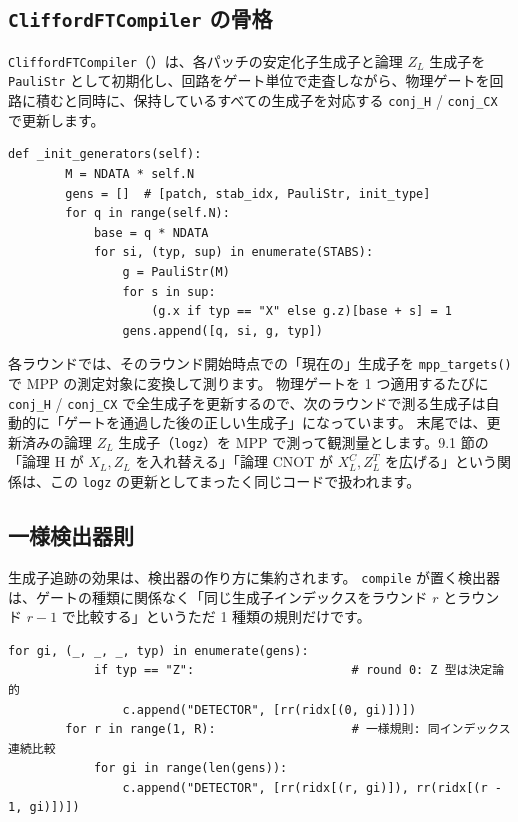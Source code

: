 \subsection{\texttt{CliffordFTCompiler} の骨格}\label{subsec:compiler}

\texttt{CliffordFTCompiler}（）は、各パッチの安定化子生成子と論理 $Z_L$ 生成子を \texttt{PauliStr} として初期化し、回路をゲート単位で走査しながら、物理ゲートを回路に積むと同時に、保持しているすべての生成子を対応する \texttt{conj\_H} / \texttt{conj\_CX} で更新します。

\begin{lstlisting}[caption={生成子の初期化とゲート適用時の共役更新（src/stages/01\_mpp/src/ftqc/clifford\_ft\_full.py）}]
    def _init_generators(self):
        M = NDATA * self.N
        gens = []  # [patch, stab_idx, PauliStr, init_type]
        for q in range(self.N):
            base = q * NDATA
            for si, (typ, sup) in enumerate(STABS):
                g = PauliStr(M)
                for s in sup:
                    (g.x if typ == "X" else g.z)[base + s] = 1
                gens.append([q, si, g, typ])
\end{lstlisting}

各ラウンドでは、そのラウンド開始時点での「現在の」生成子を \texttt{mpp\_targets()} で MPP の測定対象に変換して測ります。
物理ゲートを 1 つ適用するたびに \texttt{conj\_H} / \texttt{conj\_CX} で全生成子を更新するので、次のラウンドで測る生成子は自動的に「ゲートを通過した後の正しい生成子」になっています。
末尾では、更新済みの論理 $Z_L$ 生成子（\texttt{logz}）を MPP で測って観測量とします。9.1 節の「論理 H が $X_L, Z_L$ を入れ替える」「論理 CNOT が $X_L^C, Z_L^T$ を広げる」という関係は、この \texttt{logz} の更新としてまったく同じコードで扱われます。

\subsection{一様検出器則}\label{subsec:uniform_detector}

生成子追跡の効果は、検出器の作り方に集約されます。
\texttt{compile} が置く検出器は、ゲートの種類に関係なく「同じ生成子インデックスをラウンド $r$ とラウンド $r-1$ で比較する」というただ 1 種類の規則だけです。

\begin{lstlisting}[caption={ゲート依存の分岐を持たない一様検出器規則（src/stages/01\_mpp/src/ftqc/clifford\_ft\_full.py）}]
        for gi, (_, _, _, typ) in enumerate(gens):
            if typ == "Z":                      # round 0: Z 型は決定論的
                c.append("DETECTOR", [rr(ridx[(0, gi)])])
        for r in range(1, R):                   # 一様規則: 同インデックス連続比較
            for gi in range(len(gens)):
                c.append("DETECTOR", [rr(ridx[(r, gi)]), rr(ridx[(r - 1, gi)])])
\end{lstlisting}

